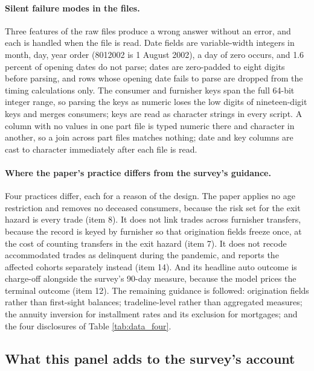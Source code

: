 \paragraph{Silent failure modes in the files.} Three features of the raw files produce a wrong answer without an error, and each is handled when the file is read. Date fields are variable-width integers in month, day, year order (8012002 is 1 August 2002), a day of zero occurs, and 1.6 percent of opening dates do not parse; dates are zero-padded to eight digits before parsing, and rows whose opening date fails to parse are dropped from the timing calculations only. The consumer and furnisher keys span the full 64-bit integer range, so parsing the keys as numeric loses the low digits of nineteen-digit keys and merges consumers; keys are read as character strings in every script. A column with no values in one part file is typed numeric there and character in another, so a join across part files matches nothing; date and key columns are cast to character immediately after each file is read.

\paragraph{Where the paper's practice differs from the survey's guidance.} Four practices differ, each for a reason of the design. The paper applies no age restriction and removes no deceased consumers, because the risk set for the exit hazard is every trade (item 8). It does not link trades across furnisher transfers, because the record is keyed by furnisher so that origination fields freeze once, at the cost of counting transfers in the exit hazard (item 7). It does not recode accommodated trades as delinquent during the pandemic, and reports the affected cohorts separately instead (item 14). And its headline auto outcome is charge-off alongside the survey's 90-day measure, because the model prices the terminal outcome (item 12). The remaining guidance is followed: origination fields rather than first-sight balances; tradeline-level rather than aggregated measures; the annuity inversion for installment rates and its exclusion for mortgages; and the four disclosures of Table \ref{tab:data_four}.

\subsection{What this panel adds to the survey's account}\label{appendix:data:adds}

